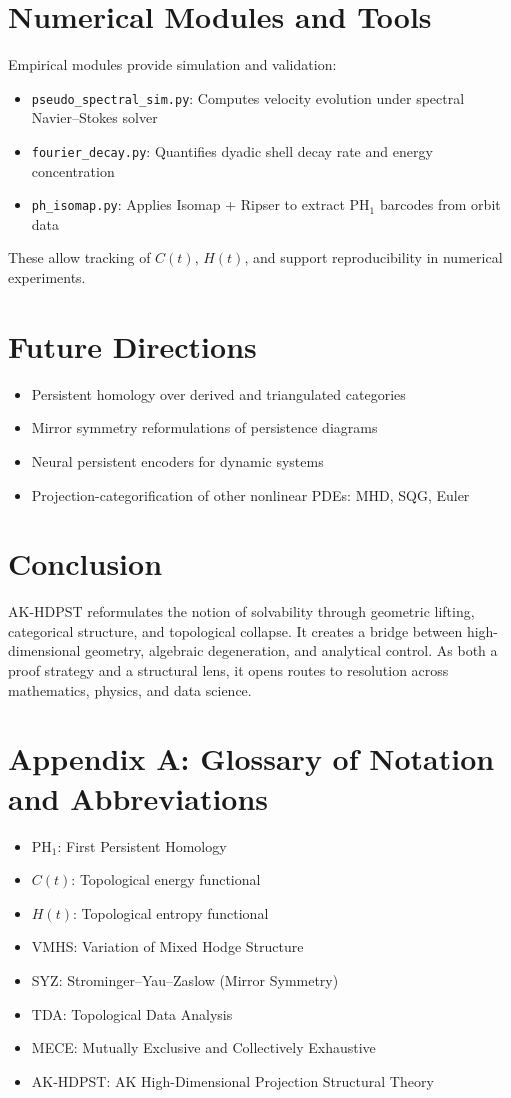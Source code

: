 \documentclass[11pt]{article}
\begin{document}
\section{Numerical Modules and Tools}
Empirical modules provide simulation and validation:
\begin{itemize}
  \item \texttt{pseudo\_spectral\_sim.py}: Computes velocity evolution under spectral Navier–Stokes solver
  \item \texttt{fourier\_decay.py}: Quantifies dyadic shell decay rate and energy concentration
  \item \texttt{ph\_isomap.py}: Applies Isomap + Ripser to extract PH$_1$ barcodes from orbit data
\end{itemize}
These allow tracking of $C(t)$, $H(t)$, and support reproducibility in numerical experiments.

\section{Future Directions}
\begin{itemize}
  \item Persistent homology over derived and triangulated categories
  \item Mirror symmetry reformulations of persistence diagrams
  \item Neural persistent encoders for dynamic systems
  \item Projection-categorification of other nonlinear PDEs: MHD, SQG, Euler
\end{itemize}

\section{Conclusion}
AK-HDPST reformulates the notion of solvability through geometric lifting, categorical structure, and topological collapse. It creates a bridge between high-dimensional geometry, algebraic degeneration, and analytical control. As both a proof strategy and a structural lens, it opens routes to resolution across mathematics, physics, and data science.

\appendix
\section*{Appendix A: Glossary of Notation and Abbreviations}
\begin{itemize}
  \item PH$_1$: First Persistent Homology
  \item $C(t)$: Topological energy functional
  \item $H(t)$: Topological entropy functional
  \item VMHS: Variation of Mixed Hodge Structure
  \item SYZ: Strominger–Yau–Zaslow (Mirror Symmetry)
  \item TDA: Topological Data Analysis
  \item MECE: Mutually Exclusive and Collectively Exhaustive
  \item AK-HDPST: AK High-Dimensional Projection Structural Theory
\end{itemize}
\end{document}
